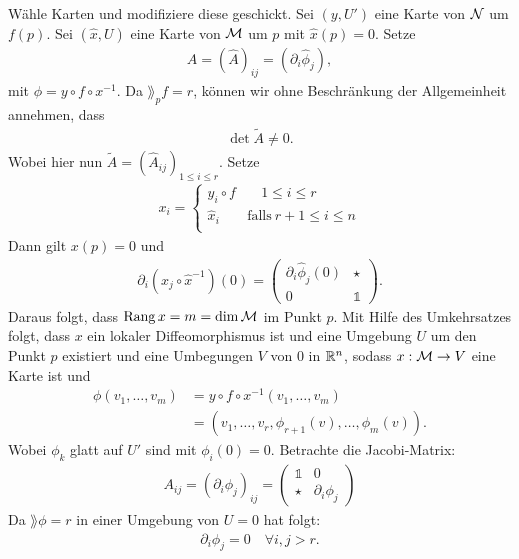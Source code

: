 \begin{bew}
Wähle Karten und modifiziere diese geschickt.
Sei $(y, U')$ eine Karte von $\mathcal{N}$ um $f(p)$.
Sei $(\hat{x}, U)$ eine Karte von $\mathcal{M}$ um $p$ mit $\hat{x}(p) = 0$.
Setze 
\begin{align}
\hat{A} = (\hat{A})_{i j} = (\partial_i \hat{\phi}_j),
\end{align}
mit $\phi = y \circ f \circ x^{-1}$.
Da $\rang_p f = r$, können wir ohne Beschränkung der Allgemeinheit annehmen, dass
\begin{align}
\det \tilde{A} \neq 0.
\end{align}
Wobei hier nun $\tilde{A} = (\hat{A}_{i j})_{1 \leq i \leq r}$.
Setze 
\begin{align}
x_i = \left\{
\begin{array}{ll}
y_i \circ f & \quad 1 \leq i \leq r \\
\hat{x}_i & \textrm{falls} \ r+1 \leq i \leq n \\
\end{array}
\right. 
\end{align}
Dann gilt $x(p)=0$ und 
\begin{align}
\partial_i (x_j \circ \hat{x}^{-1})(0) = 
\left(\begin{matrix}
\partial_i \hat{\phi}_j (0) & \star \\ 
0 & \mathds{1}
\end{matrix} \right) .
\end{align}
Daraus folgt, dass $\operatorname{Rang} x = m = \dim \mathcal{M}$ im Punkt $p$.
Mit Hilfe des Umkehrsatzes folgt, dass $x$ ein lokaler Diffeomorphismus ist 
und eine Umgebung $U$ um den Punkt $p$ existiert und eine Umbegungen $V$ von $0$ in $\mathbb{R}^n$, 
sodass $x: \mathcal{M} \to V$ eine Karte ist und
\begin{align}
\phi (v_1, \dots, v_m) &= y \circ f \circ x^{-1}(v_1, \dots, v_m) \\
&= (v_1, \dots, v_r, \phi_{r+1}(v), \dots, \phi_m (v)).
\end{align}
Wobei $\phi_k$ glatt auf $U'$ sind mit $\phi_i(0)=0$. 
Betrachte die Jacobi-Matrix:
\begin{align}
A_{i j} = (\partial _i \phi_j )_{i j} = \begin{pmatrix}
\mathds{1} & 0 \\ 
\star & \partial_i \phi_j
\end{pmatrix} 
\end{align}
Da $\rang \phi = r$ in einer Umgebung von $U=0$ hat folgt:
\begin{align}
\partial_i \phi_j = 0 \quad \forall i, j > r.
\end{align}
\end{bew}

